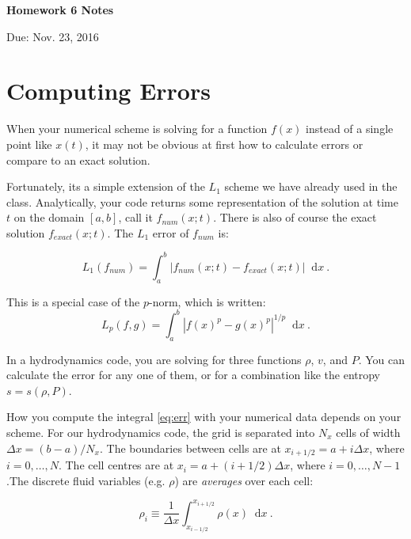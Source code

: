\documentclass{article}
\newcommand*\diff{\mathop{}\!\mathrm{d}}
\begin{document}
\begin{center}

\vspace*{-2.5cm}
\LARGE
\bf{Homework 6 Notes}
\vspace{1cm}

\large{Due: Nov. 23, 2016}
\vspace{1cm}

\end{center}

\section{Computing Errors}

When your numerical scheme is solving for a function $f(x)$ instead of a single point like $x(t)$, it may not be obvious at first how to calculate errors or compare to an exact solution.

Fortunately, its a simple extension of the $L_1$ scheme we have already used in the class.  Analytically, your code returns some representation of the solution at time $t$ on the domain $[a,b]$, call it $f_{num}(x;t)$.  There is also of course the exact solution $f_{exact}(x;t)$.  The $L_1$ error of $f_{num}$ is:

\begin{equation}
	L_1(f_{num}) = \int_a^b \left | f_{num}(x;t) - f_{exact}(x;t) \right | \diff x \ . \label{eq:err}
\end{equation}

This is a special case of the $p$-norm, which is written:
\begin{equation}
	L_p(f,g) = \int_a^b \left | f(x)^p - g(x)^p \right |^{1/p} \diff x \ .
\end{equation}

In a hydrodynamics code, you are solving for three functions $\rho$, $v$, and $P$. You can calculate the error for any one of them, or for a combination like the entropy $s = s(\rho, P)$.  

How you compute the integral \eqref{eq:err} with your numerical data depends on your scheme.  For our hydrodynamics code, the grid is separated into $N_x$ cells of width $\Delta x = (b-a) / N_x$. The boundaries between cells are at $x_{i+1/2} = a+ i \Delta x$, where $i=0,\dots,N$.  The cell centres are at $x_i = a+ (i+1/2) \Delta x$, where $i=0, \dots, N-1$.The discrete fluid variables (e.g. $\rho$) are \emph{averages} over each cell:

\begin{equation}
	\rho_i \equiv \frac{1}{\Delta x}\int_{x_{i-1/2}}^{x_{i+1/2}} \rho(x) \diff x  \ .
\end{equation}
\end{document}
